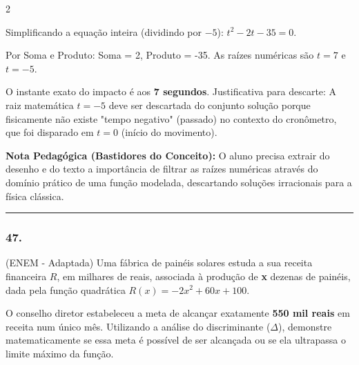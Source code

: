 \begin{multicols*}{2}
\begin{tcolorbox}[colback=CorTitUm!5, colframe=CorTitUm, boxrule=1pt, arc=4pt, left=6pt, right=6pt, top=6pt, bottom=6pt]
    Simplificando a equação inteira (dividindo por $-5$):
    $t^2 - 2t - 35 = 0$.
    
    Por Soma e Produto: Soma = 2, Produto = -35.
    As raízes numéricas são $t = 7$ e $t = -5$.
    
    O instante exato do impacto é aos \textbf{7 segundos}. 
    Justificativa para descarte: A raiz matemática $t = -5$ deve ser descartada do conjunto solução porque fisicamente não existe "tempo negativo" (passado) no contexto do cronômetro, que foi disparado em $t=0$ (início do movimento).
    \end{tcolorbox}
    \vspace{0.15cm}
    
    \begin{boxexplicacao}
    \textbf{Nota Pedagógica (Bastidores do Conceito):} O aluno precisa extrair do desenho e do texto a importância de filtrar as raízes numéricas através do domínio prático de uma função modelada, descartando soluções irracionais para a física clássica.
    \end{boxexplicacao}
\fi

\par\vspace{\espacoQuestao}

\noindent\textcolor{CorLinha}{\rule{\linewidth}{0.5pt}} 
\par\vspace{\espacoPreQuestao}
\subsubsection*{47.} 
\begin{enunciadoLiteral}
(ENEM - Adaptada) Uma fábrica de painéis solares estuda a sua receita financeira $R$, em milhares de reais, associada à produção de \textbf{x} dezenas de painéis, dada pela função quadrática $R(x) = -2x^2 + 60x + 100$.

O conselho diretor estabeleceu a meta de alcançar exatamente \textbf{550 mil reais} em receita num único mês. Utilizando a análise do discriminante ($\Delta$), demonstre matematicamente se essa meta é possível de ser alcançada ou se ela ultrapassa o limite máximo da função.
\end{enunciadoLiteral}


\end{multicols*}
